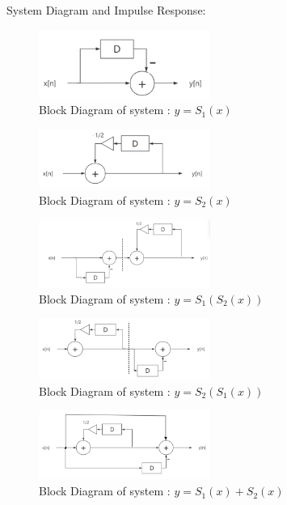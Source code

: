 \documentclass[journal]{IEEEtran}
\begin{document}
System Diagram and Impulse Response:
\begin{figure}[H]
   \centering
   \includegraphics[width=0.5\textwidth]{differ.png} %
   \caption{Block Diagram of system : $y=S_{1}(x)$}
   \label{fig:differ2} 
\end{figure}
\begin{figure}[H]
   \centering
   \includegraphics[width=0.5\textwidth]{S2.png} %
   \caption{Block Diagram of system : $y=S_{2}(x)$}
   \label{fig:S12} 
\end{figure}
\begin{figure}[H]
   \centering
   \includegraphics[width=0.5\textwidth]{S12.png} %
   \caption{Block Diagram of system : $y=S_{1}(S_{2}(x))$} 
   \label{fig:S12} 
\end{figure}
\begin{figure}[H]
   \centering
   \includegraphics[width=0.5\textwidth]{S21.png} %
   \caption{Block Diagram of system : $y=S_{2}(S_{1}(x))$} 
   \label{fig:S21} 
\end{figure}
\begin{figure}[H]
   \centering
   \includegraphics[width=0.5\textwidth]{S1S2.png} %
   \caption{Block Diagram of system : $y=S_{1}(x)+S_{2}(x)$}
   \label{fig:S1S2} 
\end{figure}
\end{document}
